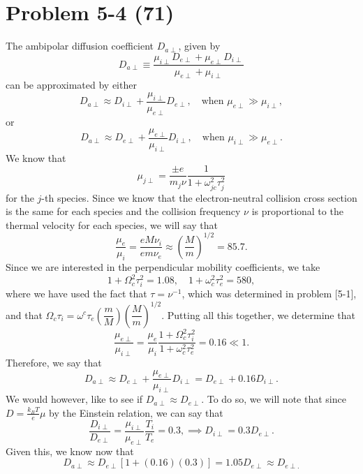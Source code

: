 \section*{Problem 5-4 (71)}
\label{sec:5-4}
The ambipolar diffusion coefficient \(D_{a\perp} \), given by
\begin{equation*}
	D_{a\perp} \equiv \dfrac{\mu_{i\perp}D_{e\perp} + \mu_{e\perp}D_{i\perp}}{\mu_{e\perp} + \mu_{i\perp}}
\end{equation*}
can be approximated by either
\begin{equation*}
	D_{a\perp} \approx D_{i\perp} + \dfrac{\mu_{i\perp}}{\mu_{e\perp}}D_{e\perp}, \quad \text{when } \mu_{e\perp} \gg \mu_{i\perp},
\end{equation*}
or
\begin{equation*}
	D_{a\perp} \approx D_{e\perp} + \dfrac{\mu_{e\perp}}{\mu_{i\perp}}D_{i\perp}, \quad \text{when } \mu_{i\perp} \gg \mu_{e\perp}.
\end{equation*}
We know that 
\begin{equation*}
	\mu_{j\perp} = \dfrac{\pm e}{m_j\nu}\dfrac{1}{1 + \omega^2_{jc}\tau^2_j}
\end{equation*}
for the \(j\)-th species. Since we know that the electron-neutral collision cross section is the same for each species and the collision frequency \(\nu \) is proportional to the thermal velocity for each species, we will say that
\begin{equation*}
	\dfrac{\mu_e}{\mu_i} = \dfrac{eM\nu_i}{em\nu_e} \approx \left(\dfrac{M}{m}\right)^{1/2} = 85.7.
\end{equation*}
Since we are interested in the perpendicular mobility coefficients, we take
\begin{equation*}
	1 + \Omega_c^2\tau_i^2 = 1.08, \quad 1 + \omega_c^2\tau_e^2 = 580,
\end{equation*}
where we have used the fact that \(\tau = \nu^{-1} \), which was determined in problem [5-1], and that \(\Omega_c\tau_i = \omega^c\tau_e\left(\dfrac{m}{M}\right)\left(\dfrac{M}{m}\right)^{1/2} \). Putting all this together, we determine that 
\begin{equation*}
	\dfrac{\mu_{e\perp}}{\mu_{i\perp}} = \dfrac{\mu_e}{\mu_i}\dfrac{1 + \Omega_c^2\tau_i^2}{1 + \omega_c^2\tau_e^2} = 0.16 \ll 1.
\end{equation*}
Therefore, we say that 
\begin{equation*}
	D_{a\perp} \approx D_{e\perp} + \dfrac{\mu_{e\perp}}{\mu_{i\perp}}D_{i\perp} = D_{e\perp} + 0.16D_{i\perp}.
\end{equation*}
We would however, like to see if \(D_{a\perp} \approx D_{e\perp} \). To do so, we will note that since \(D = \frac{k_BT}{e}\mu \) by the Einstein relation, we can say that
\begin{equation*}
	\dfrac{D_{i\perp}}{D_{e\perp}} = \dfrac{\mu_{i\perp}}{\mu_{e\perp}}\dfrac{T_i}{T_e} = 0.3, \implies D_{i\perp} = 0.3D_{e\perp}.
\end{equation*}
Given this, we know now that
\begin{equation*}
	D_{a\perp} \approx D_{e\perp}\left[1 + (0.16)(0.3) \right] = 1.05D_{e\perp} \approx D_{e\perp.}
\end{equation*}

